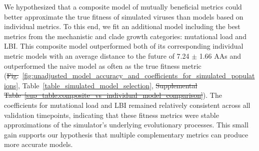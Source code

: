 \documentclass[9pt,lineno]{elife} %
\providecommand{\DIFadd}[1]{{\protect\color{blue}\uwave{#1}}} %
\providecommand{\DIFdel}[1]{{\protect\color{red}\sout{#1}}}                      %
\providecommand{\DIFaddbegin}{} %
\providecommand{\DIFaddend}{} %
\providecommand{\DIFdelbegin}{} %
\providecommand{\DIFdelend}{} %
\providecommand{\DIFaddtex}[1]{{\protect\color{blue}\uwave{#1}}} %
\providecommand{\DIFdeltex}[1]{{\protect\color{red}\sout{#1}}}                      %
\providecommand{\DIFaddbegin}{} %
\providecommand{\DIFaddend}{} %
\providecommand{\DIFdelbegin}{} %
\providecommand{\DIFdelend}{} %
\providecommand{\DIFadd}[1]{\texorpdfstring{\DIFaddtex{#1}}{#1}} %
\providecommand{\DIFdel}[1]{\texorpdfstring{\DIFdeltex{#1}}{}} %
\newcommand{\DIFscaledelfig}{0.5}
\newlength{\DIFdelgraphicswidth} %
\newlength{\DIFdelgraphicsheight} %
\newcommand{\DIFaddincludegraphics}[2][]{{\color{blue}\fbox{\DIFOincludegraphics[#1]{#2}}}} %
\newcommand{\DIFdelincludegraphics}[2][]{%
\sbox{\DIFdelgraphicsbox}{\DIFOincludegraphics[#1]{#2}}%
\settoboxwidth{\DIFdelgraphicswidth}{\DIFdelgraphicsbox} %
\settoboxtotalheight{\DIFdelgraphicsheight}{\DIFdelgraphicsbox} %
\scalebox{\DIFscaledelfig}{%
\parbox[b]{\DIFdelgraphicswidth}{\usebox{\DIFdelgraphicsbox}\\[-\baselineskip] \rule{\DIFdelgraphicswidth}{0em}}\llap{\resizebox{\DIFdelgraphicswidth}{\DIFdelgraphicsheight}{%
\setlength{\unitlength}{\DIFdelgraphicswidth}%
\begin{picture}(1,1)%
\thicklines\linethickness{2pt} %
{\color[rgb]{1,0,0}\put(0,0){\framebox(1,1){}}}%
{\color[rgb]{1,0,0}\put(0,0){\line( 1,1){1}}}%
{\color[rgb]{1,0,0}\put(0,1){\line(1,-1){1}}}%
\end{picture}%
}\hspace*{3pt}}} %
} %
\DeclareRobustCommand{\DIFaddbegin}{\DIFOaddbegin \let\includegraphics\DIFaddincludegraphics} %
\DeclareRobustCommand{\DIFaddend}{\DIFOaddend \let\includegraphics\DIFOincludegraphics} %
\DeclareRobustCommand{\DIFdelbegin}{\DIFOdelbegin \let\includegraphics\DIFdelincludegraphics} %
\DeclareRobustCommand{\DIFdelend}{\DIFOaddend \let\includegraphics\DIFOincludegraphics} %
\begin{document}
We hypothesized that a composite model of mutually beneficial metrics could better approximate the true fitness of simulated viruses than models based on individual metrics.
To this end, we fit an additional model including the best metrics from the mechanistic and clade growth categories: mutational load and LBI.
This composite model outperformed both of its corresponding individual metric models with an average distance to the future of 7.24 $\pm$ 1.66 AAs and outperformed the naive model as often as the true fitness metric (\DIFdelbegin \DIFdel{Fig.}\DIFdelend \DIFaddbegin \DIFadd{Figure}\DIFaddend ~\ref{fig:unadjusted_model_accuracy_and_coefficients_for_simulated_populations}, Table~\ref{table_simulated_model_selection}, \DIFdelbegin \DIFdel{Supplemental Table~\ref{sup_table:composite_vs_individual_model_comparison}}\DIFdelend \DIFaddbegin \DIFadd{Table~\ref{table:composite_vs_individual_model_comparison}}\DIFaddend ).
The coefficients for mutational load and LBI remained relatively consistent across all validation timepoints, indicating that these fitness metrics were stable approximations of the simulator's underlying evolutionary processes.
This small gain supports our hypothesis that multiple complementary metrics can produce more accurate models.
\end{document}
